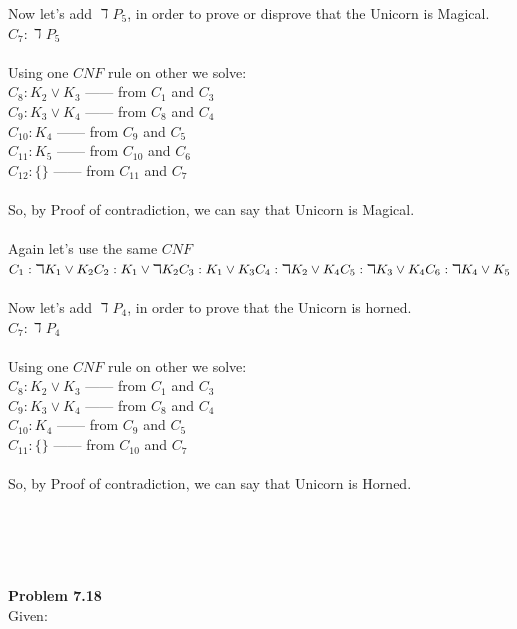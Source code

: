 \documentclass[11pt]{article}
\begin{document}
\begin{enumerate}[label=(\alph*)]
  Now let's add $\daleth P_5$, in order to prove or disprove that the Unicorn is Magical.\\
  $C_7: \daleth P_5$ \\ \\
  Using one $CNF$ rule on other we solve:\\
  $C_8: K_2 \vee  K_3$ ------ from $C_1$ and $C_3$ \\
  $C_9: K_3 \vee  K_4$ ------ from $C_8$ and $C_4$ \\
  $C_{10}: K_4$ ------ from $C_9$ and $C_5$ \\
  $C_{11}: K_5$ ------ from $C_{10}$ and $C_6$ \\
  $C_{12}: \{ \}$ ------ from $C_{11}$ and $C_7$ \\ \\
  So, by Proof of contradiction, we can say that Unicorn is Magical.\\ \\
  Again let's use the same $CNF$
  $C_1: \daleth K_1 \vee  K_2 \\
  C_2: K_1 \vee \daleth K_2\\
  C_3: K_1 \vee K_3 \\
  C_4: \daleth K_2 \vee  K_4 \\
  C_5: \daleth K_3 \vee  K_4 \\
  C_6: \daleth K_4 \vee  K_5$ \\ \\
  Now let's add $\daleth P_4$, in order to prove that the Unicorn is horned.\\
  $C_7: \daleth P_4$ \\ \\
  Using one $CNF$ rule on other we solve:\\
  $C_8: K_2 \vee  K_3$ ------ from $C_1$ and $C_3$ \\
  $C_9: K_3 \vee  K_4$ ------ from $C_8$ and $C_4$ \\
  $C_{10}: K_4$ ------ from $C_9$ and $C_5$ \\
  $C_{11}: \{ \}$ ------ from $C_{10}$ and $C_7$ \\ \\
  So, by Proof of contradiction, we can say that Unicorn is Horned.\\ \\ \\ \\ \\
\end{enumerate}
\textbf{Problem 7.18} \\
Given:
\end{document}
